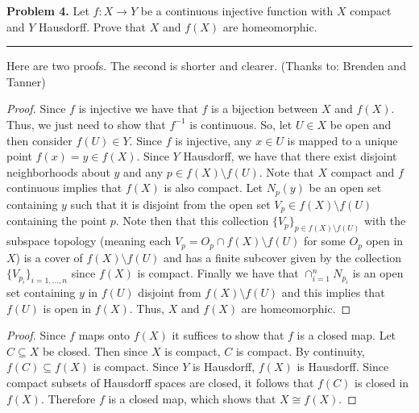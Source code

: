 \documentclass[leqno]{article}
\theoremstyle{nonumberplain}
\newtheorem{proof}{Proof}
\begin{document}
\pagebreak





\noindent\textbf{Problem 4.} Let $f\colon X\to Y$ be a continuous injective function with $X$ compact and $Y$ Hausdorff. Prove that $X$ and $f(X)$ are homeomorphic.

\noindent\rule[0.5ex]{\linewidth}{1pt}
Here are two proofs.  The second is shorter and clearer. (Thanks to: Brenden and Tanner)

\begin{proof}
Since $f$ is injective we have that $f$ is a bijection between $X$ and $f(X)$.  Thus, we just need to show that $f^{-1}$ is continuous.  So, let $U\in X$ be open and then consider $f(U)\in Y$.  Since $f$ is injective, any $x\in U$ is mapped to a unique point $f(x)=y \in f(X)$.  Since $Y$ Hausdorff, we have that there exist disjoint neighborhoods about $y$ and any $p\in f(X)\setminus f(U)$. Note that $X$ compact and $f$ continuous implies that $f(X)$ is also compact. Let $N_p (y)$ be an open set containing $y$ such that it is disjoint from the open set $V_p \in f(X)\setminus f(U)$ containing the point $p$.  Note then that this collection $\{V_p\}_{p\in f(X)\setminus f(U)}$ with the subspace topology (meaning each $V_p=O_p \cap f(X)\setminus f(U)$ for some $O_p$ open in $X$) is a cover of $f(X)\setminus f(U)$ and has a finite subcover given by the collection $\{V_{p_i}\}_{i=1,\dots, n}$ since $f(X)$ is compact. Finally we have that $\cap_{i=1}^n N_{p_i}$ is an open  set containing $y$ in $f(U)$ disjoint from $f(X)\setminus f(U)$ and this implies that $f(U)$ is open in $f(X)$. Thus, $X$ and $f(X)$ are homeomorphic.
\end{proof}

\begin{proof}
Since \(f\) maps onto \(f(X)\) it suffices to show that \(f\) is a closed map. Let \(C \subseteq X\) be closed. Then since \(X\) is compact, \(C\) is compact. By continuity, \(f(C) \subseteq f(X)\) is compact. Since \(Y\) is Hausdorff, \(f(X)\) is Hausdorff. Since compact subsets of Hausdorff spaces are closed, it follows that \(f(C)\) is closed in \(f(X)\). Therefore \(f\) is a closed map, which shows that \(X \cong f(X)\).
\end{proof}



\pagebreak
\end{document}
